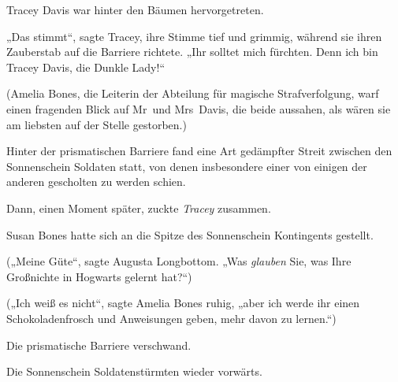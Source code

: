 Tracey Davis war hinter den Bäumen hervorgetreten.

„Das stimmt“, sagte Tracey, ihre Stimme tief und grimmig, während sie ihren Zauberstab auf die Barriere richtete. „Ihr solltet mich fürchten. Denn ich bin Tracey Davis, die Dunkle Lady!“

(Amelia Bones, die Leiterin der Abteilung für magische Strafverfolgung, warf einen fragenden Blick auf Mr~und Mrs~Davis, die beide aussahen, als wären sie am liebsten auf der Stelle gestorben.)

Hinter der prismatischen Barriere fand eine Art gedämpfter Streit zwischen den Sonnenschein Soldaten statt, von denen insbesondere einer von einigen der anderen gescholten zu werden schien.

Dann, einen Moment später, zuckte \emph{Tracey} zusammen.

Susan Bones hatte sich an die Spitze des Sonnenschein Kontingents gestellt.

(„Meine Güte“, sagte Augusta Longbottom. „Was \emph{glauben} Sie, was Ihre Großnichte in Hogwarts gelernt hat?“)

(„Ich weiß es nicht“, sagte Amelia Bones ruhig, „aber ich werde ihr einen Schokoladenfrosch und Anweisungen geben, mehr davon zu lernen.“)

Die prismatische Barriere verschwand.

Die Sonnenschein Soldatenstürmten wieder vorwärts.

